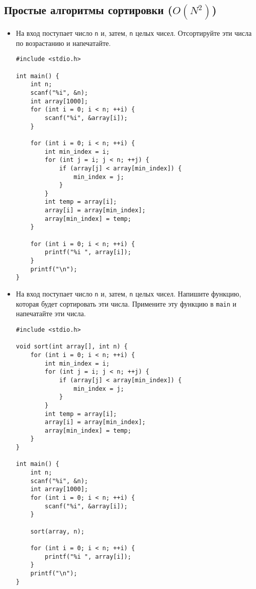 \documentclass{article}
\begin{document}
\subsection*{Простые алгоритмы сортировки ($O(N^2)$)}
\begin{itemize}
\item На вход поступает число \texttt{n} и, затем, \texttt{n} целых чисел. Отсортируйте эти числа по возрастанию и напечатайте.
\begin{lstlisting}[backgroundcolor = \color{solcolor}]
#include <stdio.h>

int main() {
    int n;
    scanf("%i", &n);
    int array[1000];
    for (int i = 0; i < n; ++i) {
        scanf("%i", &array[i]);
    }
    
    for (int i = 0; i < n; ++i) {
        int min_index = i;
        for (int j = i; j < n; ++j) {
            if (array[j] < array[min_index]) {
                min_index = j;
            }
        }
        int temp = array[i];
        array[i] = array[min_index];
        array[min_index] = temp;
    }
    
    for (int i = 0; i < n; ++i) {
        printf("%i ", array[i]);
    }
    printf("\n");
}
\end{lstlisting}
\newpage
\item На вход поступает число \texttt{n} и, затем, \texttt{n} целых чисел. Напишите функцию, которая будет сортировать эти числа. Примените эту функцию в \texttt{main} и напечатайте эти числа.

\begin{lstlisting}[backgroundcolor = \color{solcolor}]
#include <stdio.h>

void sort(int array[], int n) {
    for (int i = 0; i < n; ++i) {
        int min_index = i;
        for (int j = i; j < n; ++j) {
            if (array[j] < array[min_index]) {
                min_index = j;
            }
        }
        int temp = array[i];
        array[i] = array[min_index];
        array[min_index] = temp;
    }
}

int main() {
    int n;
    scanf("%i", &n);
    int array[1000];
    for (int i = 0; i < n; ++i) {
        scanf("%i", &array[i]);
    }
    
    sort(array, n);
    
    for (int i = 0; i < n; ++i) {
        printf("%i ", array[i]);
    }
    printf("\n");
}
\end{lstlisting}
\end{itemize}


\newpage
\end{document}
